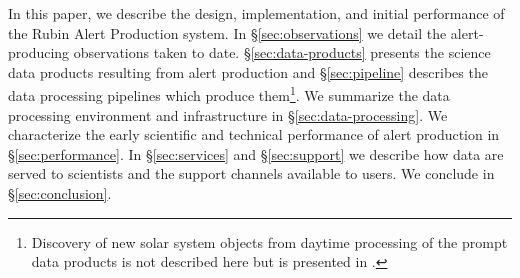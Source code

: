 In this paper, we describe the design, implementation, and initial performance of the Rubin Alert Production system.
In \S \ref{sec:observations} we detail the alert-producing observations taken to date.
\S \ref{sec:data-products} presents the science data products resulting from alert production and \S \ref{sec:pipeline} describes the data processing pipelines which produce them\footnote{
Discovery of new solar system objects from daytime processing of the prompt data products is not described here but is presented in .}.
We summarize the data processing environment and infrastructure in \S \ref{sec:data-processing}.
We characterize the early scientific and technical performance of alert production in \S \ref{sec:performance}.
In \S \ref{sec:services} and \S \ref{sec:support} we describe how data are served to scientists and the support channels available to users.
We conclude in \S \ref{sec:conclusion}.



